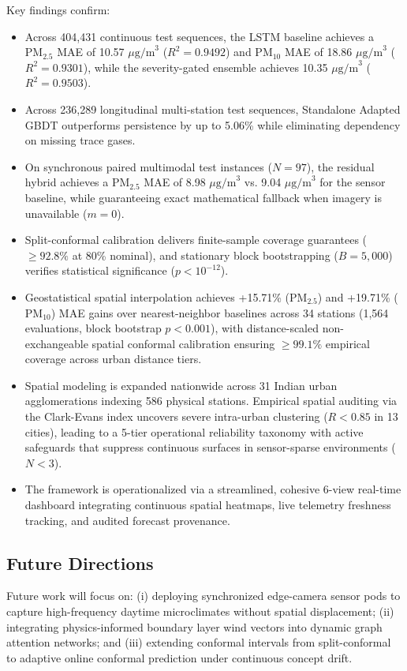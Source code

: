 \documentclass[conference]{IEEEtran}
\begin{document}
Key findings confirm:
\begin{itemize}
    \item Across 404,431 continuous test sequences, the LSTM baseline achieves a $\text{PM}_{2.5}$ MAE of 10.57 $\mu\text{g/m}^3$ ($R^2 = 0.9492$) and $\text{PM}_{10}$ MAE of 18.86 $\mu\text{g/m}^3$ ($R^2 = 0.9301$), while the severity-gated ensemble achieves 10.35 $\mu\text{g/m}^3$ ($R^2 = 0.9503$).
    \item Across 236,289 longitudinal multi-station test sequences, Standalone Adapted GBDT outperforms persistence by up to 5.06\% while eliminating dependency on missing trace gases.
    \item On synchronous paired multimodal test instances ($N=97$), the residual hybrid achieves a $\text{PM}_{2.5}$ MAE of 8.98 $\mu\text{g/m}^3$ vs. 9.04 $\mu\text{g/m}^3$ for the sensor baseline, while guaranteeing exact mathematical fallback when imagery is unavailable ($m=0$).
    \item Split-conformal calibration delivers finite-sample coverage guarantees ($\ge 92.8\%$ at 80\% nominal), and stationary block bootstrapping ($B=5,000$) verifies statistical significance ($p < 10^{-12}$).
    \item Geostatistical spatial interpolation achieves +15.71\% ($\text{PM}_{2.5}$) and +19.71\% ($\text{PM}_{10}$) MAE gains over nearest-neighbor baselines across 34 stations (1,564 evaluations, block bootstrap $p < 0.001$), with distance-scaled non-exchangeable spatial conformal calibration ensuring $\ge 99.1\%$ empirical coverage across urban distance tiers.
    \item Spatial modeling is expanded nationwide across 31 Indian urban agglomerations indexing 586 physical stations. Empirical spatial auditing via the Clark-Evans index uncovers severe intra-urban clustering ($R < 0.85$ in 13 cities), leading to a 5-tier operational reliability taxonomy with active safeguards that suppress continuous surfaces in sensor-sparse environments ($N < 3$).
    \item The framework is operationalized via a streamlined, cohesive 6-view real-time dashboard integrating continuous spatial heatmaps, live telemetry freshness tracking, and audited forecast provenance.
\end{itemize}

\subsection{Future Directions}
Future work will focus on: (i) deploying synchronized edge-camera sensor pods to capture high-frequency daytime microclimates without spatial displacement; (ii) integrating physics-informed boundary layer wind vectors into dynamic graph attention networks; and (iii) extending conformal intervals from split-conformal to adaptive online conformal prediction under continuous concept drift.



\end{document}
